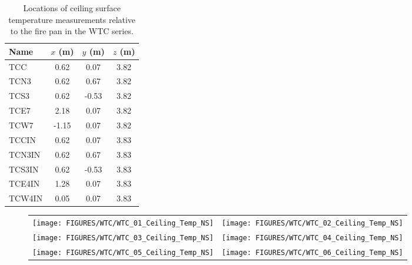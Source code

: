 \begin{table}[h!]
\caption[Ceiling surface measurement locations for the WTC series]{Locations of ceiling surface temperature measurements relative to the fire pan in the WTC series.}
\begin{center}
\begin{tabular}{|l|c|c|c|}
\hline
Name                & $x$ (m)   & $y$ (m)   & $z$ (m)   \\ \hline \hline
TCC                 & 0.62      & 0.07      & 3.82      \\ \hline
TCN3                & 0.62      & 0.67      & 3.82      \\ \hline
TCS3                & 0.62      & -0.53     & 3.82      \\ \hline
TCE7                & 2.18      & 0.07      & 3.82      \\ \hline
TCW7                & -1.15     & 0.07      & 3.82      \\ \hline \hline
TCCIN               & 0.62      & 0.07      & 3.83      \\ \hline
TCN3IN              & 0.62      & 0.67      & 3.83      \\ \hline
TCS3IN              & 0.62      & -0.53     & 3.83      \\ \hline
TCE4IN              & 1.28      & 0.07      & 3.83      \\ \hline
TCW4IN              & 0.05      & 0.07      & 3.83      \\ \hline
\end{tabular}
\end{center}
\label{WTC_Ceiling}
\end{table}

\newpage

\begin{figure}[p]
\begin{tabular*}{\textwidth}{l@{\extracolsep{\fill}}r}
\texttt{[image: FIGURES/WTC/WTC\_01\_Ceiling\_Temp\_NS]} &
\texttt{[image: FIGURES/WTC/WTC\_02\_Ceiling\_Temp\_NS]} \\
\texttt{[image: FIGURES/WTC/WTC\_03\_Ceiling\_Temp\_NS]} &
\texttt{[image: FIGURES/WTC/WTC\_04\_Ceiling\_Temp\_NS]} \\
\texttt{[image: FIGURES/WTC/WTC\_05\_Ceiling\_Temp\_NS]} &
\texttt{[image: FIGURES/WTC/WTC\_06\_Ceiling\_Temp\_NS]}
\end{tabular*}
\label{NIST_WTC_Ceiling_NS}
\end{figure}

